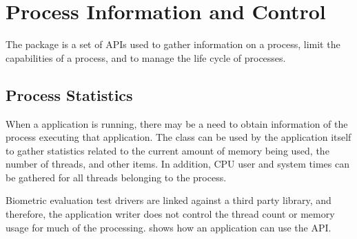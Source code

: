 %
%
\chapter{Process Information and Control}
\label{chp-process}

The  package is a set of APIs used to gather information on
a process, limit the capabilities of a process, and to manage the life cycle
of processes.

\section{Process Statistics}
\label{sec-process_statistics}

When a application is running, there may be a need to obtain information of the
process executing that application. The  class can
be used by the application itself to gather statistics related to the current
amount of memory being used, the number of threads, and other items. In
addition, CPU user and system times can be gathered for all threads belonging
to the process.

Biometric evaluation test
drivers are linked against a third party library, and therefore, the application
writer does not control the thread count or memory usage for much of the
processing.  shows how an application can
use the  API.

